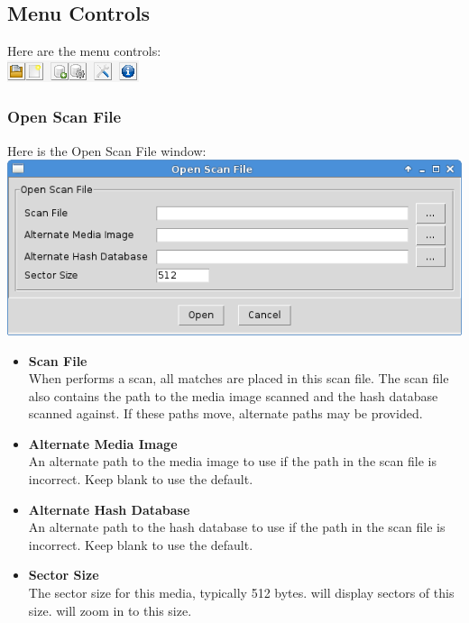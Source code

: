 \documentclass[11pt,fleqn]{article} %
\begin{document}
\subsection{Menu Controls}
Here are the menu controls:\\
\includegraphics[scale=.4]{screenshots/menu_controls}\\

\subsubsection{Open Scan File}
Here is the Open Scan File window:\\
\includegraphics[scale=.4]{screenshots/open_scan_file}\\
\begin{itemize}
\item \textbf{Scan File}\\
When \hdb performs a scan, all matches are placed in this scan file. The scan file also contains the path to the media image scanned and the hash database scanned against. If these paths move, alternate paths may be provided.
\item \textbf{Alternate Media Image}\\
An alternate path to the media image to use if the path in the scan file is incorrect. Keep blank to use the default.
\item \textbf{Alternate Hash Database}\\
An alternate path to the hash database to use if the path in the scan file is incorrect. Keep blank to use the default.
\item \textbf{Sector Size}\\
The sector size for this media, typically 512 bytes. \sscope will display sectors of this size. \sscope will zoom in to this size.
\end{itemize}
\end{document}
